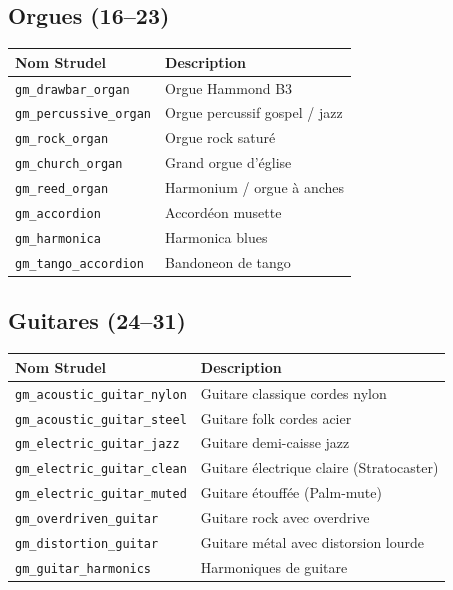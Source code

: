 \documentclass[a4paper,10pt]{article}
\begin{document}
\subsection{Orgues (16--23)}
\begin{tabularx}{\linewidth}{|l|X|}
\hline
\textbf{Nom Strudel} & \textbf{Description} \\
\hline
\texttt{gm\_drawbar\_organ} & Orgue Hammond B3 \\
\texttt{gm\_percussive\_organ} & Orgue percussif gospel / jazz \\
\texttt{gm\_rock\_organ} & Orgue rock saturé \\
\texttt{gm\_church\_organ} & Grand orgue d'église \\
\texttt{gm\_reed\_organ} & Harmonium / orgue à anches \\
\texttt{gm\_accordion} & Accordéon musette \\
\texttt{gm\_harmonica} & Harmonica blues \\
\texttt{gm\_tango\_accordion} & Bandoneon de tango \\
\hline
\end{tabularx}

\subsection{Guitares (24--31)}
\begin{tabularx}{\linewidth}{|l|X|}
\hline
\textbf{Nom Strudel} & \textbf{Description} \\
\hline
\texttt{gm\_acoustic\_guitar\_nylon} & Guitare classique cordes nylon \\
\texttt{gm\_acoustic\_guitar\_steel} & Guitare folk cordes acier \\
\texttt{gm\_electric\_guitar\_jazz} & Guitare demi-caisse jazz \\
\texttt{gm\_electric\_guitar\_clean} & Guitare électrique claire (Stratocaster) \\
\texttt{gm\_electric\_guitar\_muted} & Guitare étouffée (Palm-mute) \\
\texttt{gm\_overdriven\_guitar} & Guitare rock avec overdrive \\
\texttt{gm\_distortion\_guitar} & Guitare métal avec distorsion lourde \\
\texttt{gm\_guitar\_harmonics} & Harmoniques de guitare \\
\hline
\end{tabularx}
\end{document}
